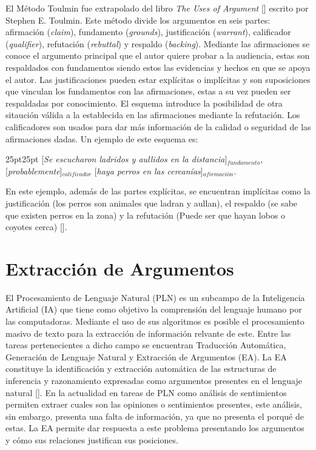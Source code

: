 El Método Toulmin fue extrapolado del libro \emph{The Uses of Argument} [\cite{toulmin_2003}] escrito por Stephen E. Toulmin.
Este método divide los argumentos en seis partes: afirmación (\emph{claim}), fundamento (\emph{grounds}), 
justificación (\emph{warrant}), calificador (\emph{qualifier}), refutación (\emph{rebuttal}) y respaldo (\emph{backing}).
Mediante las afirmaciones se conoce el argumento principal que el autor quiere probar a la audiencia,
estas son respaldados con fundamentos siendo estos las evidencias y hechos en que se apoya el autor.
Las justificaciones pueden estar explícitas o implícitas y son suposiciones que vinculan los
fundamentos con las afirmaciones, estas a su vez pueden ser respaldadas por conocimiento.
El esquema introduce la posibilidad de otra sitaución válida a la establecida en las afirmaciones
mediante la refutación. Los calificadores son usados para dar más información de la calidad o seguridad
de las afirmaciones dadas. Un ejemplo de este esquema es:

\begin{adjustwidth}{25pt}{25pt}
    [\emph{Se escucharon ladridos y aullidos en la distancia}]$_{fundamento}$, 
    [\emph{probablemente}]$_{calificador}$ 
    [\emph{haya perros en las cercanías}]$_{afirmación}$.
\end{adjustwidth}

En este ejemplo, además de las partes explícitas, se encuentran implícitas como la justificación 
(los perros son animales que ladran y aullan), el respaldo (se sabe que existen perros en la zona) y 
la refutación (Puede ser que hayan lobos o coyotes cerca) [\cite{toulminArgument}].
  
\section{Extracción de Argumentos}

El Procesamiento de Lenguaje Natural (PLN) es un 
subcampo de la Inteligencia Artificial (IA) que tiene como objetivo la comprensión del lenguaje humano por 
las computadoras. 
Mediante el uso de sus algoritmos es posible el procesamiento masivo de texto para la extracción de información 
relvante de este. Entre las tareas pertenecientes a dicho campo se encuentran Traducción Automática, 
Generación de Lenguaje Natural y Extracción de Argumentos (EA). La EA constituye la identificación y extracción 
automática de las estructuras de inferencia y 
razonamiento expresadas como argumentos presentes en el lenguaje natural [\cite{lawrence2020argument}].
En la actualidad en tareas de PLN como análisis de sentimientos permiten 
extraer cuales son las opiniones o sentimientos presentes, este análisis, sin embargo, presenta una falta 
de información, ya que no presenta el porqué de estas. La EA permite dar respuesta a este problema presentando
los argumentos y cómo sus relaciones justifican sus posiciones.

